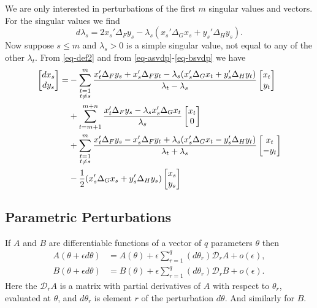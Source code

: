 \documentclass[
  12pt,
  letterpaper,
  DIV=11,
  numbers=noendperiod]{scrartcl}
\begin{document}
We are only interested in perturbations of the first \(m\) singular
values and vectors. For the singular values we find \begin{equation}
d\lambda_s=2x_s'\Delta_Fy_s-\lambda_s(x_s'\Delta_Gx_s+y_s'\Delta_Hy_s).\label{eq-svdlbd}
\end{equation} Now suppose \(s\leq m\) and \(\lambda_s>0\) is a simple
singular value, not equal to any of the other \(\lambda_t\). From
\eqref{eq-def2} and from \eqref{eq-asvdp}-\eqref{eq-bsvdp} we have
\begin{align}
\begin{bmatrix}dx_s\\dy_s\end{bmatrix}=
&-\sum_{\substack{t=1\\t\not= s}}^m\frac{x_t'\Delta_Fy_s+x_s'\Delta_Fy_t-\lambda_s(x_s'\Delta_Gx_t+y_s'\Delta_Hy_t)}{\lambda_t-\lambda_s}\begin{bmatrix}x_t\\y_t\end{bmatrix}\notag\\
&+\sum_{t=m+1}^{m+n}\frac{x_t'\Delta_Fy_s-\lambda_sx_s'\Delta_Gx_t}{\lambda_s}\begin{bmatrix}x_t\\0\end{bmatrix}\notag\\
&+\sum_{\substack{t=1\\t\not= s}}^m\frac{x_t'\Delta_Fy_s-x_s'\Delta_Fy_t+\lambda_s(x_s'\Delta_Gx_t-y_s'\Delta_Hy_t)}{\lambda_t+\lambda_s}\begin{bmatrix}x_t\\-y_t\end{bmatrix}\notag\\
&-\frac12(x_s'\Delta_Gx_s+y_s'\Delta_Hy_s)\begin{bmatrix}x_s\\y_s\end{bmatrix}
\end{align}

\subsection{Parametric Perturbations}\label{sec-parametric}

If \(A\) and \(B\) are differentiable functions of a vector of \(q\)
parameters \(\theta\) then \begin{subequations}
\begin{align}
A(\theta+\epsilon d\theta)&=A(\theta)+\epsilon\sum_{r=1}^q (d\theta_r)\mathcal{D}_rA+o(\epsilon),\label{eq-par1}\\
B(\theta+\epsilon d\theta)&=B(\theta)+\epsilon\sum_{r=1}^q (d\theta_r)\mathcal{D}_rB+o(\epsilon).\label{eq-par2}
\end{align}
\end{subequations} Here the \(\mathcal{D}_rA\) is a matrix with partial
derivatives of \(A\) with respect to \(\theta_r\), evaluated at
\(\theta\), and \(d\theta_r\) is element \(r\) of the perturbation
\(d\theta\). And similarly for \(B\).
\end{document}

